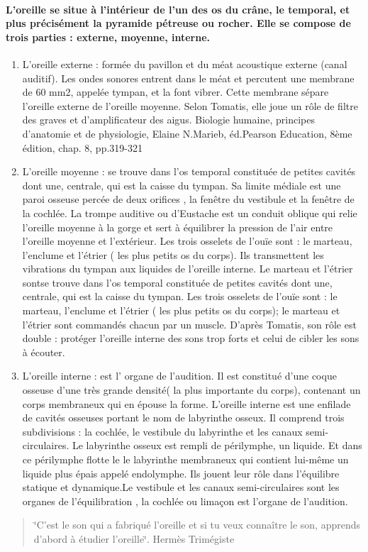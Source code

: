 \documentclass[12pt,french]{report}
\makeatletter
\let\SF@@footnote\footnote
\def\footnote{\ifx\protect\@typeset@protect
    \expandafter\SF@@footnote
  \else
    \expandafter\SF@gobble@opt
  \fi
}
\edef\SF@gobble@opt{\noexpand\protect
  \expandafter\noexpand\csname SF@gobble@opt \endcsname}
\makeatother
\begin{document}
\paragraph{L'oreille se situe à l'intérieur de l'un des os du crâne, le temporal,
et plus précisément la pyramide pétreuse ou rocher. Elle se compose
de trois parties : externe, moyenne, interne.}
\begin{enumerate}
\item L'oreille externe : formée du pavillon et du méat acoustique externe
(canal auditif). Les ondes sonores entrent dans le méat et percutent
une membrane de 60 mm2, appelée tympan, et la font vibrer. Cette membrane
sépare l'oreille externe de l'oreille moyenne. Selon Tomatis, elle
joue un rôle de filtre des graves et d'amplificateur des aigus.\footnote{Biologie humaine, principes d'anatomie et de physiologie, Elaine N.Marieb,
éd.Pearson Education, 8ème édition, chap. 8, pp.319-321}
\item L'oreille moyenne : se trouve dans l'os temporal constituée de petites
cavités dont une, centrale, qui est la caisse du tympan. Sa limite
médiale est une paroi osseuse percée de deux orifices , la fenêtre
du vestibule et la fenêtre de la cochlée. La trompe auditive ou d'Eustache
est un conduit oblique qui relie l'oreille moyenne à la gorge et sert
à équilibrer la pression de l'air entre l'oreille moyenne et l'extérieur.
Les trois osselets de l'ouïe sont : le marteau, l'enclume et l'étrier
( les plus petits os du corps). Ils transmettent les vibrations du
tympan aux liquides de l'oreille interne. Le marteau et l'étrier sontse
trouve dans l'os temporal constituée de petites cavités dont une,
centrale, qui est la caisse du tympan. Les trois osselets de l'ouïe
sont : le marteau, l'enclume et l'étrier ( les plus petits os du corps);
le marteau et l'étrier sont commandés chacun par un muscle. D'après
Tomatis, son rôle est double : protéger l'oreille interne des sons
trop forts et celui de cibler les sons à écouter.
\item L'oreille interne : est l' organe de l\textquoteright audition. Il
est constitué d'une coque osseuse d'une très grande densité( la plus
importante du corps), contenant un corps membraneux qui en épouse
la forme. L'oreille interne est une enfilade de cavités osseuses portant
le nom de labyrinthe osseux. Il comprend trois subdivisions : la cochlée,
le vestibule du labyrinthe et les canaux semi-circulaires. Le labyrinthe
osseux est rempli de périlymphe, un liquide. Et dans ce périlymphe
flotte le le labyrinthe membraneux qui contient lui-même un liquide
plus épais appelé endolymphe. Ils jouent leur rôle dans l'équilibre
statique et dynamique.Le vestibule et les canaux semi-circulaires
sont les organes de l\textquoteright équilibration , la cochlée ou
limaçon est l'organe de l'audition. 
\end{enumerate}
\begin{quotation}
\char`\"{}C'est le son qui a fabriqué l'oreille et si tu veux connaître
le son, apprends d'abord à étudier l\textquoteright oreille\char`\"{}.
Hermès Trimégiste
\end{quotation}
\end{document}
